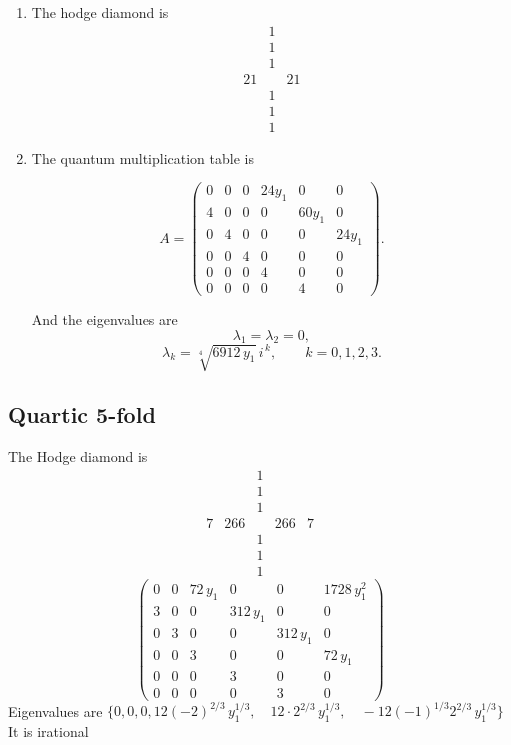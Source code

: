 \documentclass[11pt]{amsart}
\newcounter{num}[section] %
\begin{document}
\begin{enumerate}
  \item [1)]The hodge diamond is
    \[
        \begin{array}{ccc}
            &1&   \\
             &1&\\
             &1&\\
             21&&21\\
             &1&\\
             &1&\\
             &1&
        \end{array}
    \]
    \item[] The quantum multiplication table is

    \[
A=
\begin{pmatrix}
0 & 0 & 0 & 24y_1 & 0 & 0 \\
4 & 0 & 0 & 0 & 60y_1 & 0 \\
0 & 4 & 0 & 0 & 0 & 24y_1 \\
0 & 0 & 4 & 0 & 0 & 0 \\
0 & 0 & 0 & 4 & 0 & 0 \\
0 & 0 & 0 & 0 & 4 & 0
\end{pmatrix}.
\]

And the eigenvalues are
\[
\lambda_1=\lambda_2=0,
\]
\[
\lambda_k
=
\sqrt[4]{6912\,y_1}\,i^{\,k},
\qquad k=0,1,2,3.
\]
\end{enumerate}

\subsection{Quartic 5-fold}
The Hodge diamond is 
\[
    \begin{array}{ccccc}
         &&1&&  \\
         &&1&&\\
         &&1&&\\
         7&266&&266&7\\
            &&1&&  \\
         &&1&&\\
         &&1&&
    \end{array}
\]
\[
\begin{pmatrix}
0 & 0 & 72\, y_1 & 0 & 0 & 1728\, y_1^2 \\
3 & 0 & 0 & 312\, y_1 & 0 & 0 \\
0 & 3 & 0 & 0 & 312\, y_1 & 0 \\
0 & 0 & 3 & 0 & 0 & 72\, y_1 \\
0 & 0 & 0 & 3 & 0 & 0 \\
0 & 0 & 0 & 0 & 3 & 0
\end{pmatrix}
\]
Eigenvalues are $\{0,0,0,12(-2)^{2/3}\, y_1^{1/3}, \quad
12 \cdot 2^{2/3}\, y_1^{1/3}, \quad
-12(-1)^{1/3} 2^{2/3}\, y_1^{1/3}\}$\\
It is irational
\end{document}
